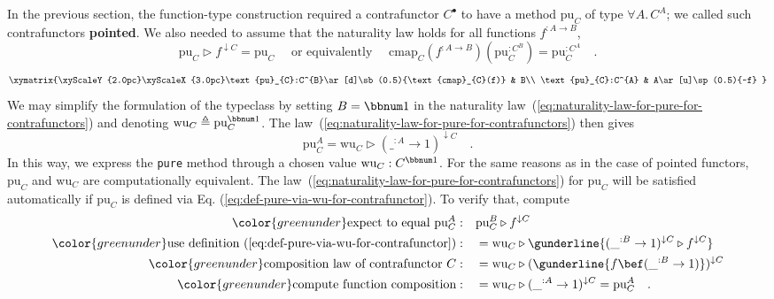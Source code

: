 In the previous section, the function-type construction required a
contrafunctor $C^{\bullet}$ to have a method $\text{pu}_{C}$ of
type $\forall A.\,C^{A}$; we called such contrafunctors \textbf{pointed}.
We also needed to assume that the naturality law holds for all functions
$f^{:A\rightarrow B}$, 
\begin{equation}
\text{pu}_{C}\triangleright f^{\downarrow C}=\text{pu}_{C}\quad\text{ or equivalently }\quad\text{cmap}_{C}(f^{:A\rightarrow B})(\text{pu}_{C}^{:C^{B}})=\text{pu}_{C}^{:C^{A}}\quad.\label{eq:naturality-law-for-pure-for-contrafunctors}
\end{equation}
\[
\xymatrix{\xyScaleY{2.0pc}\xyScaleX{3.0pc}\text{pu}_{C}:C^{B}\ar[d]\sb(0.5){\text{cmap}_{C}(f)} & B\\
\text{pu}_{C}:C^{A} & A\ar[u]\sp(0.5){~f}
}
\]
We may simplify the formulation of the typeclass by setting $B=\bbnum 1$
in the naturality law~(\ref{eq:naturality-law-for-pure-for-contrafunctors})
and denoting $\text{wu}_{C}\triangleq\text{pu}_{C}^{\bbnum 1}$. The
law~(\ref{eq:naturality-law-for-pure-for-contrafunctors}) then gives
\begin{equation}
\text{pu}_{C}^{A}=\text{wu}_{C}\triangleright(\_^{:A}\rightarrow1)^{\downarrow C}\quad.\label{eq:def-pure-via-wu-for-contrafunctor}
\end{equation}
In this way, we express the \lstinline!pure! method through a chosen
value $\text{wu}_{C}:C^{\bbnum 1}$. For the same reasons as in the
case of pointed functors, $\text{pu}_{C}$ and $\text{wu}_{C}$ are
computationally equivalent. The law~(\ref{eq:naturality-law-for-pure-for-contrafunctors})
for $\text{pu}_{C}$ will be satisfied automatically if $\text{pu}_{C}$
is defined via Eq. (\ref{eq:def-pure-via-wu-for-contrafunctor}).
To verify that, compute
\begin{align*}
{\color{greenunder}\text{expect to equal }\text{pu}_{C}^{A}:}\quad & \text{pu}_{C}^{B}\triangleright f^{\downarrow C}\\
{\color{greenunder}\text{use definition~(\ref{eq:def-pure-via-wu-for-contrafunctor})}:}\quad & =\text{wu}_{C}\triangleright\gunderline{(\_^{:B}\rightarrow1)^{\downarrow C}\triangleright f^{\downarrow C}}\\
{\color{greenunder}\text{composition law of contrafunctor }C:}\quad & =\text{wu}_{C}\triangleright(\gunderline{f\bef(\_^{:B}\rightarrow1)})^{\downarrow C}\\
{\color{greenunder}\text{compute function composition}:}\quad & =\text{wu}_{C}\triangleright(\_^{:A}\rightarrow1)^{\downarrow C}=\text{pu}_{C}^{A}\quad.
\end{align*}
